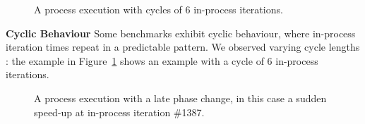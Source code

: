 \documentclass[a4paper,UKenglish]{lipics}
\begin{document}
\begin{figure}[tbp]
\caption{A process execution with cycles of 6 in-process iterations.}
\label{fig:examples:cycles}
\end{figure}

\textbf{Cyclic Behaviour} \label{sub:cyclic}
Some benchmarks exhibit cyclic behaviour, where in-process iteration times
repeat in a predictable pattern. We observed varying cycle lengths : the example in
Figure~\ref{fig:examples:cycles} shows an example with a cycle of 6 in-process
iterations.


\begin{figure}[tbp]
\caption{A process execution with a late phase change, in this case a sudden
speed-up at in-process iteration \#1387.}
\label{fig:examples:late1}
\end{figure}
\end{document}

